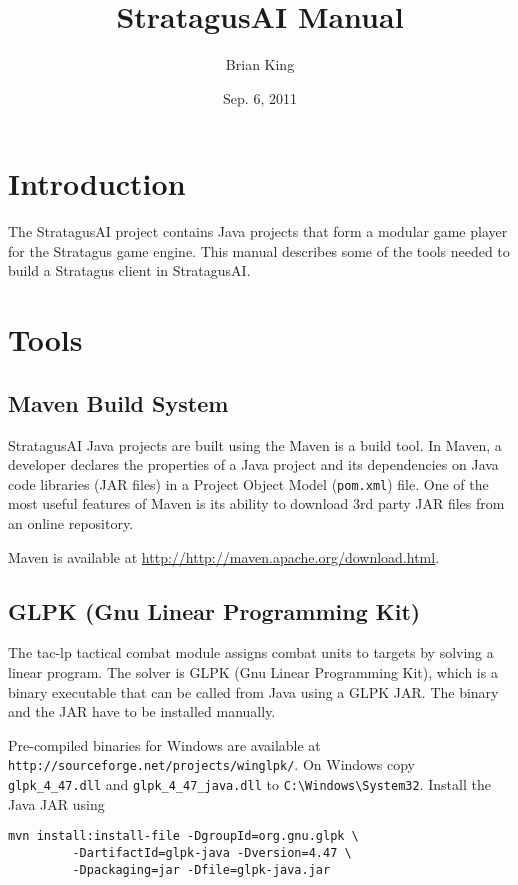 \documentclass{article}
\title{StratagusAI Manual}
\date{Sep. 6, 2011}
\author{Brian King}
\begin{document}
\maketitle

\section*{Introduction}
The StratagusAI project contains Java projects that form a modular game player for the Stratagus game engine.  This manual describes 
some of the tools needed to build a Stratagus client in StratagusAI.

\section*{Tools}

\subsection*{Maven Build System}
StratagusAI Java projects are built using the Maven is a build tool.  In Maven, a developer declares the properties of a Java project and its dependencies 
on Java code libraries (JAR files) in a Project Object Model (\verb+pom.xml+) file.  One of the most useful features of Maven is its ability to 
download 3rd party JAR files from an online repository.

Maven is available at \url{http://http://maven.apache.org/download.html}.

\subsection*{GLPK (Gnu Linear Programming Kit)}

The tac-lp tactical combat module assigns combat units to targets by solving a linear program. The solver is GLPK (Gnu Linear Programming Kit),
which is a binary executable that can be called from Java using a GLPK JAR.  The binary and the JAR have to be installed manually.

Pre-compiled binaries for Windows are available at \verb+http://sourceforge.net/projects/winglpk/+.  
On Windows copy \verb+glpk_4_47.dll+ and \verb+glpk_4_47_java.dll+
to \verb+C:\Windows\System32+. Install the Java JAR using

\begin{verbatim}
mvn install:install-file -DgroupId=org.gnu.glpk \
         -DartifactId=glpk-java -Dversion=4.47 \
         -Dpackaging=jar -Dfile=glpk-java.jar
\end{verbatim}
\end{document}
